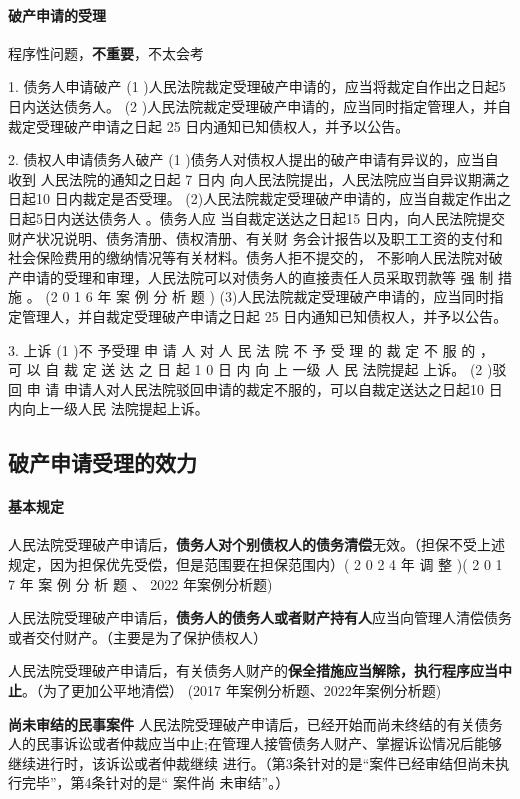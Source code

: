 \documentclass[UTF8,12pt]{ctexart}
\numberwithin{equation}{section} %
\numberwithin{figure}{section}
\numberwithin{table}{section}
\begin{document}
	\paragraph{破产申请的受理}
	程序性问题，\textbf{不重要}，不太会考
	
	
	1. 债务人申请破产
	(1 )人民法院裁定受理破产申请的，应当将裁定自作出之日起5 日内送达债务人。
	(2 )人民法院裁定受理破产申请的，应当同时指定管理人，并自裁定受理破产申请之日起 25 日内通知已知债权人，并予以公告。
	
	2. 债权人申请债务人破产
	(1 )债务人对债权人提出的破产申请有异议的，应当自收到 人民法院的通知之日起 7 日内 向人民法院提出，人民法院应当自异议期满之日起10 日内裁定是否受理。 (2)人民法院裁定受理破产申请的，应当自裁定作出之日起5日内送达债务人 。债务人应 当自裁定送达之日起15 日内，向人民法院提交财产状况说明、债务清册、债权清册、有关财 务会计报告以及职工工资的支付和社会保险费用的缴纳情况等有关材料。债务人拒不提交的， 不影响人民法院对破产申请的受理和审理，人民法院可以对债务人的直接责任人员采取罚款等 强 制 措 施 。 (2 0 1 6 年 案 例 分 析 题 ) (3)人民法院裁定受理破产申请的，应当同时指定管理人，并自裁定受理破产申请之日起 25 日内通知已知债权人，并予以公告。
	
	3. 上诉
	(1 )不 予受理
	申 请 人 对 人 民 法 院 不 予 受 理 的 裁 定 不 服 的 ， 可 以 自 裁 定 送 达 之 日 起 1 0 日 内 向 上 一级 人 民 法院提起 上诉。
	(2 )驳 回 申 请
	申请人对人民法院驳回申请的裁定不服的，可以自裁定送达之日起10 日内向上一级人民 法院提起上诉。
	
	\subsection{破产申请受理的效力}
	
	\paragraph{基本规定}
	人民法院受理破产申请后，\textbf{债务人对个别债权人的债务清偿}无效。（担保不受上述规定，因为担保优先受偿，但是范围要在担保范围内）( 2 0 2 4 年 调 整 )( 2 0 1 7 年 案 例 分 析 题 、 2022 年案例分析题)

	人民法院受理破产申请后，\textbf{债务人的债务人或者财产持有人}应当向管理人清偿债务或者交付财产。（主要是为了保护债权人）
	
	人民法院受理破产申请后，有关债务人财产的\textbf{保全措施应当解除，执行程序应当中止}。（为了更加公平地清偿） (2017 年案例分析题、2022年案例分析题)

	\textbf{尚未审结的民事案件} 人民法院受理破产申请后，已经开始而尚未终结的有关债务人的民事诉讼或者仲裁应当中止;在管理人接管债务人财产、掌握诉讼情况后能够继续进行时，该诉讼或者仲裁继续 进行。（第3条针对的是“案件已经审结但尚未执行完毕”，第4条针对的是“ 案件尚 未审结”。）
	
\end{document}
